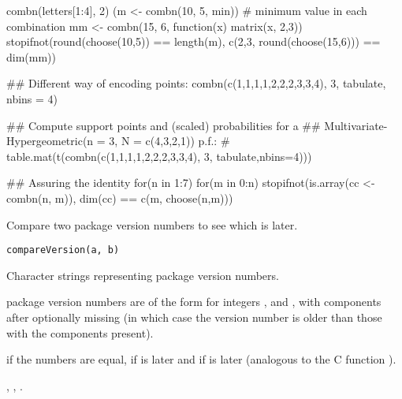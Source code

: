 \begin{Examples}
\begin{ExampleCode}
combn(letters[1:4], 2)
(m <- combn(10, 5, min))   # minimum value in each combination
mm <- combn(15, 6, function(x) matrix(x, 2,3))
stopifnot(round(choose(10,5)) == length(m),
          c(2,3, round(choose(15,6))) == dim(mm))

## Different way of encoding points:
combn(c(1,1,1,1,2,2,2,3,3,4), 3, tabulate, nbins = 4)

## Compute support points and (scaled) probabilities for a
## Multivariate-Hypergeometric(n = 3, N = c(4,3,2,1)) p.f.:
# table.mat(t(combn(c(1,1,1,1,2,2,2,3,3,4), 3, tabulate,nbins=4)))

## Assuring the identity
for(n in 1:7)
 for(m in 0:n) stopifnot(is.array(cc <- combn(n, m)),
                         dim(cc) == c(m, choose(n,m)))
\end{ExampleCode}
\end{Examples}
%
\begin{Description}\relax
Compare two package version numbers to see which is later.
\end{Description}
%
\begin{Usage}
\begin{verbatim}
compareVersion(a, b)
\end{verbatim}
\end{Usage}
%
\begin{Arguments}
\begin{ldescription}
\item[\code{a, b}] Character strings representing package version numbers.
\end{ldescription}
\end{Arguments}
%
\begin{Details}\relax
\R{} package version numbers are of the form  for integers
,  and , with components after 
optionally missing (in which case the version number is older than
those with the components present). 
\end{Details}
%
\begin{Value}
 if the numbers are equal,  if  is later
and  if  is later (analogous to the C function
).
\end{Value}
%
\begin{SeeAlso}\relax
{},
, .
\end{SeeAlso}
